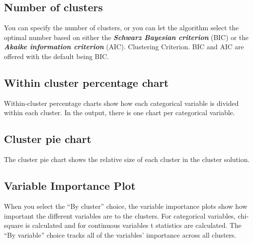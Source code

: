 \subsection{Number of clusters}
You can specify the number of clusters, or you can let the algorithm select the optimal number based on either the 
\textbf{\textit{Schwarz Bayesian criterion}} (BIC) or the \textbf{\textit{Akaike information criterion}} (AIC).
Clustering Criterion. BIC and AIC are offered with the default being BIC.



\subsection{Within cluster percentage chart} Within-cluster percentage charts show how each categorical variable is divided within each cluster. 
In the output, there is one chart per categorical variable.
\subsection{Cluster pie chart} The cluster pie chart shows the relative size of each cluster in the cluster solution.
\subsection{Variable Importance Plot} When you select the “By cluster” choice, the variable importance plots show how important the different variables are to the clusters. For categorical variables, chi-square is calculated and for continuous variables t statistics are calculated. 
The ``By variable” choice tracks all of the variables’ importance across all clusters.


